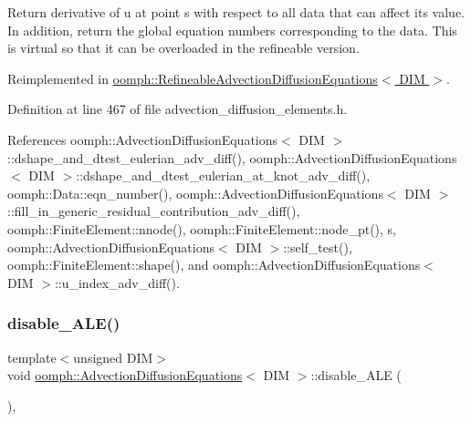 Return derivative of u at point s with respect to all data that can affect its value. In addition, return the global equation numbers corresponding to the data. This is virtual so that it can be overloaded in the refineable version. 



Reimplemented in \hyperlink{classoomph_1_1RefineableAdvectionDiffusionEquations_abebbab739a9f15f659ad6039499c7e59}{oomph\+::\+Refineable\+Advection\+Diffusion\+Equations$<$ D\+I\+M $>$}.



Definition at line 467 of file advection\+\_\+diffusion\+\_\+elements.\+h.



References oomph\+::\+Advection\+Diffusion\+Equations$<$ D\+I\+M $>$\+::dshape\+\_\+and\+\_\+dtest\+\_\+eulerian\+\_\+adv\+\_\+diff(), oomph\+::\+Advection\+Diffusion\+Equations$<$ D\+I\+M $>$\+::dshape\+\_\+and\+\_\+dtest\+\_\+eulerian\+\_\+at\+\_\+knot\+\_\+adv\+\_\+diff(), oomph\+::\+Data\+::eqn\+\_\+number(), oomph\+::\+Advection\+Diffusion\+Equations$<$ D\+I\+M $>$\+::fill\+\_\+in\+\_\+generic\+\_\+residual\+\_\+contribution\+\_\+adv\+\_\+diff(), oomph\+::\+Finite\+Element\+::nnode(), oomph\+::\+Finite\+Element\+::node\+\_\+pt(), s, oomph\+::\+Advection\+Diffusion\+Equations$<$ D\+I\+M $>$\+::self\+\_\+test(), oomph\+::\+Finite\+Element\+::shape(), and oomph\+::\+Advection\+Diffusion\+Equations$<$ D\+I\+M $>$\+::u\+\_\+index\+\_\+adv\+\_\+diff().

\mbox{\label{classoomph_1_1AdvectionDiffusionEquations_aa635388e5e1139e0a1eae97ca89279d0}} 
\subsubsection{\texorpdfstring{disable\+\_\+\+A\+L\+E()}{disable\_ALE()}}
{\footnotesize\ttfamily template$<$unsigned D\+IM$>$ \\
void \hyperlink{classoomph_1_1AdvectionDiffusionEquations}{oomph\+::\+Advection\+Diffusion\+Equations}$<$ D\+IM $>$\+::disable\+\_\+\+A\+LE (\begin{DoxyParamCaption}{ }\end{DoxyParamCaption})\hspace{0.3cm}{\ttfamily [inline]}, {\ttfamily [virtual]}}



